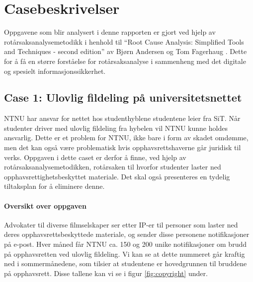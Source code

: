 \chapter{Casebeskrivelser}
\label{kap:casebeskrivelser}
Oppgavene som blir analysert i denne rapporten er gjort ved hjelp av rotårsaksanalysemetodikk i henhold til ``Root Cause Analysis: Simplified Tools and Techniques - second edition'' av Bjørn Andersen og Tom Fagerhaug \cite{RCA}. Dette for å få en større forståelse for rotårsaksanalyse i sammenheng med det digitale og spesielt informasjonssikkerhet.

\section{Case 1: Ulovlig fildeling på universitetsnettet}
\label{sec:case_fildeling}
NTNU har ansvar for nettet hos studenthyblene studentene leier fra SiT. Når studenter driver med ulovlig fildeling fra hybelen vil NTNU kunne holdes ansvarlig. Dette er et problem for NTNU, ikke bare i form av skadet omdømme, men det kan også være problematisk hvis opphavsrettshaverne går juridisk til verks. Oppgaven i dette caset er derfor å finne, ved hjelp av rotårsaksanalysemetodikken, rotårsaken til hvorfor studenter laster ned opphavsrettighetsbeskyttet materiale. Det skal også presenteres en tydelig tiltaksplan for å eliminere denne.

\subsubsection{Oversikt over oppgaven}
Advokater til diverse filmselskaper ser etter IP-er til personer som laster ned deres opphavsrettsbeskyttede materiale, og sender disse personene notifikasjoner på e-post. Hver måned får NTNU ca. 150 og 200 unike notifikasjoner om brudd på opphavsretten ved ulovlig fildeling. Vi kan se at dette nummeret går kraftig ned i sommermånedene, som tilsier at studentene er hovedgrunnen til bruddene på opphavsrett. Disse tallene kan vi se i figur \ref{fig:copyright} under.

